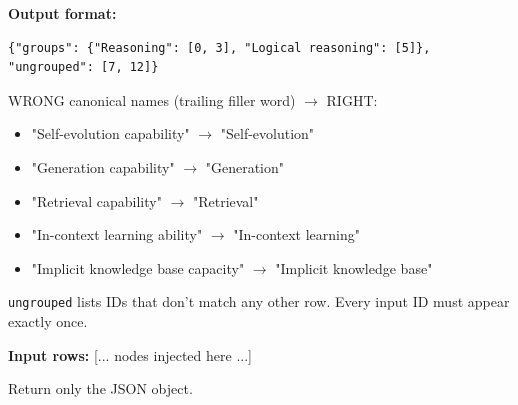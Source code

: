 \begin{tcolorbox}[breakable,enhanced,colback=blue!3,colframe=blue!40!black,title={Prompt},fonttitle=\bfseries,left=8pt,right=8pt,top=6pt,bottom=6pt]
\textbf{Output format:}
\begin{verbatim}
{"groups": {"Reasoning": [0, 3], "Logical reasoning": [5]}, "ungrouped": [7, 12]}
\end{verbatim}
WRONG canonical names (trailing filler word) $\rightarrow$ RIGHT:
\begin{itemize}
\item "Self-evolution capability" $\rightarrow$ "Self-evolution"
\item "Generation capability" $\rightarrow$ "Generation"
\item "Retrieval capability" $\rightarrow$ "Retrieval"
\item "In-context learning ability" $\rightarrow$ "In-context learning"
\item "Implicit knowledge base capacity" $\rightarrow$ "Implicit knowledge base"
\end{itemize}

\texttt{ungrouped} lists IDs that don't match any other row. Every input ID must appear exactly once.

\textbf{Input rows:}
[... nodes injected here ...]

Return only the JSON object.
\end{tcolorbox}
